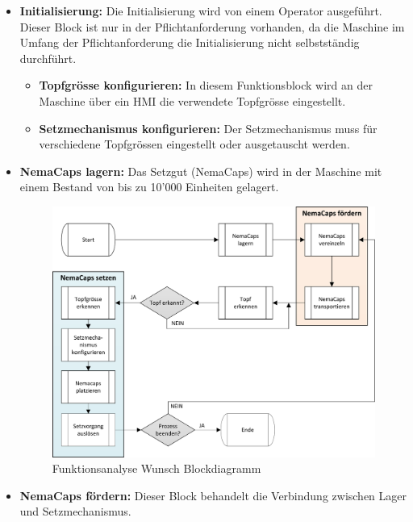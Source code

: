 \begin{itemize}
	\item \textbf{Initialisierung:} Die Initialisierung wird von einem Operator ausgeführt. Dieser Block ist nur in der Pflichtanforderung vorhanden, da die Maschine im Umfang der Pflichtanforderung die Initialisierung nicht selbstständig durchführt.
	
	\begin{itemize}
		\item \textbf{Topfgrösse konfigurieren:} In diesem Funktionsblock wird an der Maschine über ein HMI die verwendete Topfgrösse eingestellt.

		\item \textbf{Setzmechanismus konfigurieren:} Der Setzmechanismus muss für verschiedene Topfgrössen eingestellt oder ausgetauscht werden.
	\end{itemize}
	
	\item \textbf{NemaCaps lagern:} Das Setzgut (NemaCaps) wird in der Maschine mit einem Bestand von bis zu 10'000 Einheiten gelagert.
	
	\begin{figure}[H]
		\includegraphics[width=1\textwidth]{Illustrationen/2-Funktionsanalyse/Funktionsanalyse_Wunsch.png}
		\caption{Funktionsanalyse Wunsch Blockdiagramm}
		\label{fig:FunktWunsch}
	\end{figure}
	
	\item \textbf{NemaCaps fördern:} Dieser Block behandelt die Verbindung zwischen Lager und Setzmechanismus.
	

\end{itemize}

